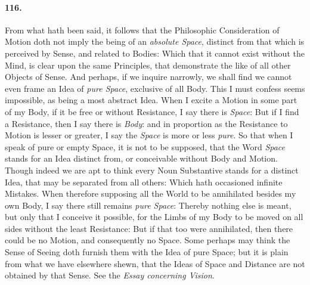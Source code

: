 \documentclass[]{article}
\newenvironment{sectionbody}{\begin{multicols}{2}}{\end{multicols}}
\begin{document}
\begin{sectionbody}
\paragraph{116.} From what hath been said, it follows that the Philosophic
Consideration of Motion doth not imply the being of an
\emph{absolute Space}, distinct from that which is perceived by
Sense, and related to Bodies: Which that it cannot exist without
the Mind, is clear upon the same Principles, that demonstrate the
like of all other Objects of Sense.  And perhaps, if we inquire
narrowly, we shall find we cannot even frame an Idea of \emph{pure
Space}, exclusive of all Body.  This I must confess seems
impossible, as being a most abstract Idea.  When I excite a
Motion in some part of my Body, if it be free or without
Resistance, I say there is \emph{Space}: But if I find a
Resistance, then I say there is \emph{Body}: and in proportion
as the Resistance to Motion is lesser or greater, I say the
\emph{Space} is more or less \emph{pure}.  So that when I
speak of pure or empty Space, it is not to be supposed, that the
Word \emph{Space} stands for an Idea distinct from, or
conceivable without Body and Motion.  Though indeed we are apt to
think every Noun Substantive stands for a distinct Idea, that may
be separated from all others: Which hath occasioned infinite
Mistakes.  When therefore supposing all the World to be
annihilated besides my own Body, I say there still remains
\emph{pure Space}: Thereby nothing else is meant, but only that
I conceive it possible, for the Limbs of my Body to be moved on
all sides without the least Resistance: But if that too were
annihilated, then there could be no Motion, and consequently no
Space.  Some perhaps may think the Sense of Seeing doth furnish
them with the Idea of pure Space; but it is plain from what we
have elsewhere shewn, that the Ideas of Space and Distance are
not obtained by that Sense.  See the \emph{Essay concerning
Vision}.




\end{sectionbody}
\end{document}

